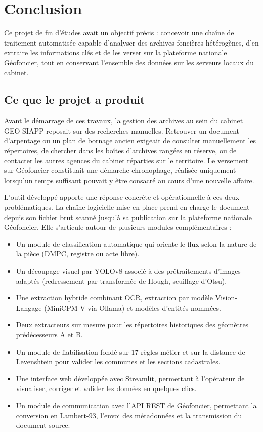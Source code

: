 
\section{Conclusion}
\label{sec:conclusion_generale}

Ce projet de fin d'études avait un objectif précis : concevoir une chaîne de traitement automatisée capable d'analyser des archives foncières hétérogènes, d'en extraire les informations clés et de les verser sur la plateforme nationale Géofoncier, tout en conservant l'ensemble des données sur les serveurs locaux du cabinet.


\subsection{Ce que le projet a produit}

Avant le démarrage de ces travaux, la gestion des archives au sein du cabinet GEO-SIAPP reposait sur des recherches manuelles. Retrouver un document d'arpentage ou un plan de bornage ancien exigeait de consulter manuellement les répertoires, de chercher dans les boîtes d'archives rangées en réserve, ou de contacter les autres agences du cabinet réparties sur le territoire. Le versement sur Géofoncier constituait une démarche chronophage, réalisée uniquement lorsqu'un temps suffisant pouvait y être consacré au cours d'une nouvelle affaire.

L'outil développé apporte une réponse concrète et opérationnelle à ces deux problématiques. La chaîne logicielle mise en place prend en charge le document depuis son fichier brut scanné jusqu'à sa publication sur la plateforme nationale Géofoncier. Elle s'articule autour de plusieurs modules complémentaires :
\begin{itemize}
  \item Un module de classification automatique qui oriente le flux selon la nature de la pièce (DMPC, registre ou acte libre).
  \item Un découpage visuel par YOLOv8 associé à des prétraitements d'images adaptés (redressement par transformée de Hough, seuillage d'Otsu).
  \item Une extraction hybride combinant OCR, extraction par modèle Vision-Langage (MiniCPM-V via Ollama) et modèles d'entités nommées.
  \item Deux extracteurs sur mesure pour les répertoires historiques des géomètres prédécesseurs A et B.
  \item Un module de fiabilisation fondé sur 17 règles métier et sur la distance de Levenshtein pour valider les communes et les sections cadastrales.
  \item Une interface web développée avec Streamlit, permettant à l'opérateur de visualiser, corriger et valider les données en quelques clics.
  \item Un module de communication avec l'API REST de Géofoncier, permettant la conversion en Lambert-93, l'envoi des métadonnées et la transmission du document source.
\end{itemize}

